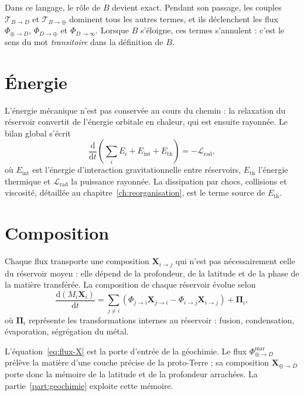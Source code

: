 \documentclass[11pt,a4paper,openany]{report}
\newcommand{\dd}{\mathrm{d}}
\begin{document}
\begin{ideephys}
Dans ce langage, le rôle de $B$ devient exact. Pendant son passage, les couples
$\boldsymbol{\mathcal{T}}_{B\to D}$ et $\boldsymbol{\mathcal{T}}_{B\to\oplus}$ dominent tous les autres
termes, et ils déclenchent les flux $\Phi_{\oplus\to D}$, $\Phi_{D\to\oplus}$ et $\Phi_{D\to\infty}$. Lorsque
$B$ s'éloigne, ces termes s'annulent : c'est le sens du mot \emph{transitoire} dans la définition
de $B$.
\end{ideephys}

\section{Énergie}

L'énergie mécanique n'est pas conservée au cours du chemin : la relaxation du réservoir
convertit de l'énergie orbitale en chaleur, qui est ensuite rayonnée. Le bilan global s'écrit
\begin{equation}
\frac{\dd}{\dd t}\left(\sum_iE_i+E_{\mathrm{int}}+E_{\mathrm{th}}\right)=-\mathcal{L}_{\mathrm{rad}},
\label{eq:energie}
\end{equation}
où $E_{\mathrm{int}}$ est l'énergie d'interaction gravitationnelle entre réservoirs, $E_{\mathrm{th}}$
l'énergie thermique et $\mathcal{L}_{\mathrm{rad}}$ la puissance rayonnée. La dissipation par chocs,
collisions et viscosité, détaillée au chapitre~\ref{ch:reorganisation}, est le terme source de
$E_{\mathrm{th}}$.

\section{Composition}

Chaque flux transporte une composition $\mathbf{X}_{i\to j}$ qui n'est pas nécessairement celle du
réservoir moyen : elle dépend de la profondeur, de la latitude et de la phase de la matière
transférée. La composition de chaque réservoir évolue selon
\begin{equation}
\frac{\dd(M_i\mathbf{X}_i)}{\dd t}=\sum_{j\neq i}\left(\Phi_{j\to i}\mathbf{X}_{j\to i}
-\Phi_{i\to j}\mathbf{X}_{i\to j}\right)+\boldsymbol{\Pi}_i,
\label{eq:flux-X}
\end{equation}
où $\boldsymbol{\Pi}_i$ représente les transformations internes au réservoir : fusion, condensation,
évaporation, ségrégation du métal.

\begin{lecture}
L'équation~\eqref{eq:flux-X} est la porte d'entrée de la géochimie. Le flux
$\Phi_{\oplus\to D}^{\mathrm{mar}}$ prélève la matière d'une couche précise de la proto-Terre ; sa
composition $\mathbf{X}_{\oplus\to D}$ porte donc la mémoire de la latitude et de la profondeur
arrachées. La partie~\ref{part:geochimie} exploite cette mémoire.
\end{lecture}
\end{document}
